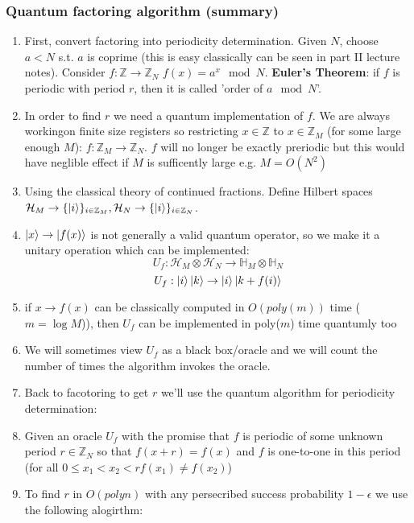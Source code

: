 \documentclass{article}
\begin{document}
\subsubsection{Quantum factoring algorithm (summary)}
\begin{enumerate}
        \item First, convert factoring into periodicity determination. Given $N$, choose $a< N$ s.t. $a$ is coprime (this is easy classically can be seen in part II lecture notes). Consider $f: \mathbb{Z} \rightarrow \mathbb{Z}_N$ $f(x) = a^x \mod N$. \textbf{Euler's Theorem}: if $f$ is periodic with period $r$, then it is called 'order of $a \mod N$'. 
        \item In order to find $r$ we need a quantum implementation of $f$. We are always workingon finite size registers so restricting $x \in \mathbb{Z}$ to $x \in \mathbb{Z}_M$ (for some large enough $M$): $f: \mathbb{Z}_M \rightarrow \mathbb{Z}_N$. $f$ will no longer be exactly preriodic but this would have neglible effect if $M$ is sufficently large e.g. $M=O(N^2)$
        \item Using the classical theory of continued fractions. Define Hilbert spaces $\mathcal{H}_M \rightarrow \{\ket{i}\}_{i \in \mathbb{Z}_M}, \mathcal{H}_N\rightarrow \{\ket{i}\}_{i \in \mathbb{Z}_N}$.
        \item $\ket{x} \rightarrow \ket{f(x)}$ is not generally a valid quantum operator, so we make it a unitary operation which can be implemented:
                $$
                U_f: \mathcal{H}_M \otimes \mathcal{H}_N \rightarrow \mathbb{H}_M \otimes \mathbb{H}_N
                $$
                $$
                U_f: \ket{i} \ket{k} \rightarrow \ket{i} \ket{k + f(i)}
                $$
        \item if $x \rightarrow f(x)$ can be classically computed in $O(poly(m))$ time ($m = \log M$)), then $U_f$ can be implemented in poly($m$) time quantumly too
        \item We will sometimes view $U_f$ as a black box/oracle and we will count the number of times the algorithm invokes the oracle.
        \item Back to facotoring to get $r$ we'll use the quantum algorithm for periodicity determination:
        \item Given an oracle $U_f$ with the promise that $f$ is periodic of some unknown period $r \in \mathbb{Z}_N$ so that $f(x+r) = f(x)$ and $f$ is one-to-one in this period (for all $0 \leq x_1 < x_2<r f(x_1) \neq f(x_2)$)
        \item To find $r$ in $O(poly n)$ with any persecribed success probability $1-\epsilon$ we use the following alogirthm:

\end{enumerate}
\end{document}
